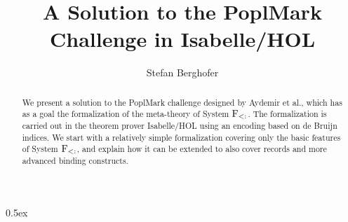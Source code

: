 \documentclass[11pt,a4paper]{article}
\newcommand{\fsub}{$\hbox{F}_{<:}$}
\begin{document}
\title{A Solution to the {\sc PoplMark} Challenge in Isabelle/HOL}
\author{Stefan Berghofer}
\maketitle

\begin{abstract}
We present a solution to the {\sc PoplMark} challenge designed by Aydemir et al.,
which has as a goal the formalization of the meta-theory of System \fsub{}.
The formalization is carried out in the theorem prover Isabelle/HOL using an
encoding based on de Bruijn indices. We start with a relatively simple formalization
covering only the basic features of System \fsub{}, and explain how it can be extended
to also cover records and more advanced binding constructs.
\end{abstract}

\tableofcontents

\parindent 0pt\parskip 0.5ex





\end{document}

